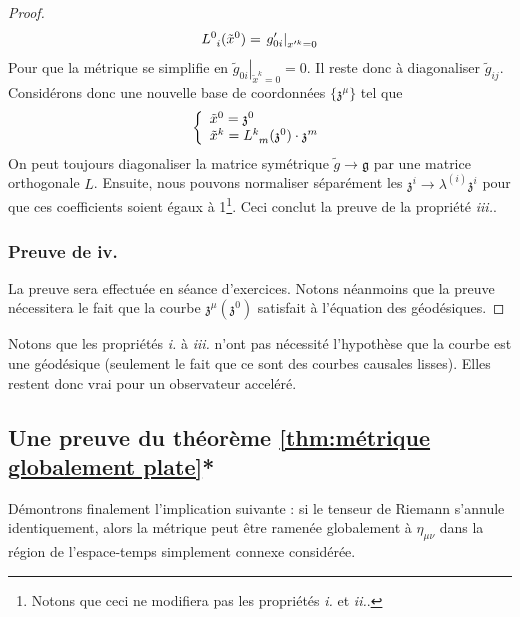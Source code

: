 \begin{proof}
\begin{equation}
        L\indices{^0_i}(\tilde{x}^0) = \left. g'_{0i} \right|_{x'^k = 0}
    \end{equation}
    Pour que la métrique se simplifie en $\left. \tilde{g}_{0i} \right|_{\tilde{x}^k = 0} = 0$. Il reste donc à diagonaliser $\tilde{g}_{ij}$. Considérons donc une nouvelle base de coordonnées $\{\mathfrak{z}^\mu \}$ tel que
    \begin{equation}
        \left\{
        \begin{array}{l}
            \tilde{x}^0 = \mathfrak{z}^0\\
            \tilde{x}^k = L\indices{^k_m}(\mathfrak{z}^0) \cdot \mathfrak{z}^m
        \end{array}
        \right.
    \end{equation}
    On peut toujours diagonaliser la matrice symétrique $\tilde{g} \to \mathfrak{g}$ par une matrice orthogonale $L$. Ensuite, nous pouvons normaliser séparément les $\mathfrak{z}^i \to \lambda^{(i)} \mathfrak{z}^i $ pour que ces coefficients soient égaux à 1\footnote{Notons que ceci ne modifiera pas les propriétés \emph{i.} et \emph{ii.}.}. Ceci conclut la preuve de la propriété \emph{iii.}. 
    
    \subsubsection{Preuve de iv.}
    La preuve sera effectuée en séance d'exercices. Notons néanmoins que la preuve nécessitera le fait que la courbe $\mathfrak{z}^\mu(\mathfrak{z}^0)$ satisfait à l'équation des géodésiques.
\end{proof}
Notons que les propriétés \emph{i.} à \emph{iii.} n'ont pas nécessité l'hypothèse que la courbe est une géodésique (seulement le fait que ce sont des courbes causales lisses). Elles restent donc vrai pour un observateur acceléré.
\subsection{Une preuve du théorème \ref{thm:métrique globalement plate}*}
\label{Preuve: thm4.42}
Démontrons finalement l'implication suivante : si le tenseur de Riemann s'annule identiquement, alors la métrique peut être ramenée globalement à $\eta_{\mu\nu}$ dans la région de l'espace-temps simplement connexe considérée.

